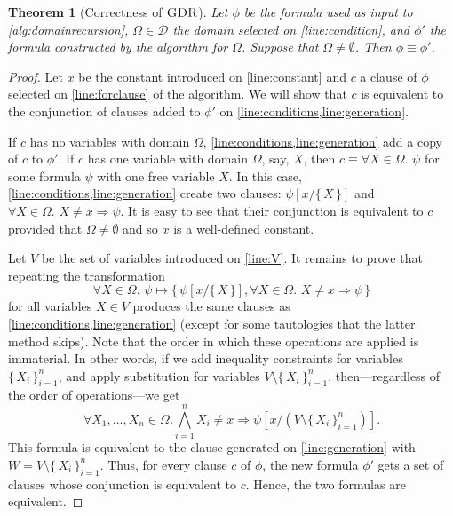 \documentclass{article}
\newtheorem{theorem}{Theorem}
\DeclareMathOperator{\GDR}{\textsc{GDR}}
\begin{document}
\begin{theorem}[Correctness of $\GDR$]
  Let $\phi$ be the formula used as input to \cref{alg:domainrecursion},
  $\Omega \in \mathcal{D}$ the domain selected on \cref{line:condition}, and
  $\phi'$ the formula constructed by the algorithm for $\Omega$. Suppose that
  $\Omega \ne \emptyset$. Then $\phi \equiv \phi'$.
\end{theorem}
\begin{proof}
  Let $x$ be the constant introduced on \cref{line:constant} and $c$ a clause of
  $\phi$ selected on \cref{line:forclause} of the algorithm. We will show that
  $c$ is equivalent to the conjunction of clauses added to $\phi'$ on
  \cref{line:conditions,line:generation}.

  If $c$ has no variables with domain $\Omega$,
  \cref{line:conditions,line:generation} add a copy of $c$ to $\phi'$. If $c$
  has one variable with domain $\Omega$, say, $X$, then
  $c \equiv \forall X \in \Omega\text{. } \psi$ for some formula $\psi$ with one
  free variable $X$. In this case, \cref{line:conditions,line:generation} create
  two clauses: $\psi[x/\{\, X \,\}]$ and $\forall X \in \Omega\text{.
  } X \ne x \Rightarrow \psi$. It is easy to see that their conjunction is
  equivalent to $c$ provided that $\Omega \ne \emptyset$ and so $x$ is a
  well-defined constant.

  Let $V$ be the set of variables introduced on \cref{line:V}. It remains to
  prove that repeating the transformation
  \[
    \forall X \in \Omega\text{. } \psi \mapsto \{\, \psi[x/\{\, X \,\}], \forall X \in \Omega\text{. } X \ne x \Rightarrow \psi \,\}
  \]
  for all variables $X \in V$ produces the same clauses as
  \cref{line:conditions,line:generation} (except for some tautologies that the
  latter method skips). Note that the order in which these operations are
  applied is immaterial. In other words, if we add inequality constraints for
  variables ${\{\, X_{i} \,\}}_{i=1}^{n}$, and apply substitution for variables
  $V \setminus {\{\, X_{i} \,\}}_{i=1}^{n}$, then---regardless of the order of
  operations---we get
  \[
    \forall X_{1}, \dots, X_{n} \in \Omega\text{.} \bigwedge_{i=1}^{n} X_{i} \ne x \Rightarrow \psi\left[x / \left(V \setminus {\{\, X_{i} \,\}}_{i=1}^{n}\right)\right].
  \]
  This formula is equivalent to the clause generated on \cref{line:generation}
  with $W = V \setminus {\{\, X_{i} \,\}}_{i=1}^{n}$. Thus, for every clause $c$
  of $\phi$, the new formula $\phi'$ gets a set of clauses whose conjunction is
  equivalent to $c$. Hence, the two formulas are equivalent.
\end{proof}
\end{document}
